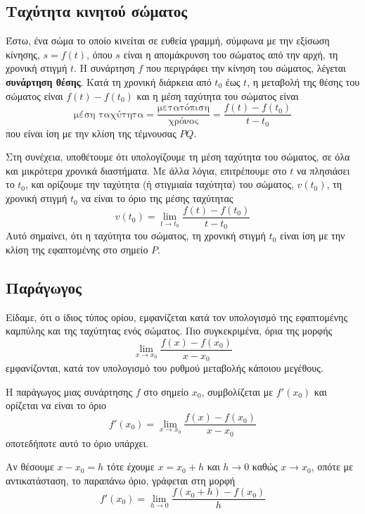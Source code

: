 \subsection*{Ταχύτητα κινητού σώματος}


Έστω, ένα σώμα το οποίο κινείται σε ευθεία γραμμή, σύμφωνα με την εξίσωση κίνησης, 
$ s=f(t) $, όπου $s$ είναι η απομάκρυνση του σώματος από την αρχή, τη χρονική στιγμή
$t$. Η συνάρτηση $f$ που περιγράφει την κίνηση του σώματος, λέγεται 
\textbf{συνάρτηση θέσης}. Κατά τη χρονική διάρκεια από $ t_{0} $ έως $ t $, η μεταβολή 
της θέσης του σώματος είναι $ f(t)-f(t_{0}) $ και η μέση ταχύτητα του σώματος είναι
\[
  \text{μέση ταχύτητα} = \frac{\text{μετατόπιση}}{\text{χρόνος}} = 
  \frac{f(t)-f(t_{0})}{t- t_{0}}  
\] 
που είναι ίση με την κλίση της τέμνουσας $ PQ $.

Στη συνέχεια, υποθέτουμε ότι υπολογίζουμε τη μέση ταχύτητα του σώματος, σε όλα και 
μικρότερα χρονικά διαστήματα. Με άλλα λόγια, επιτρέπουμε στο $t$ να πλησιάσει το 
$ t_{0} $, και ορίζουμε την ταχύτητα (ή στιγμιαία ταχύτητα) του σώματος, $ v(t_{0}) $, 
τη χρονική στιγμή $ t_{0} $ να είναι το όριο της μέσης ταχύτητας
\[
  v(t_{0}) = \lim_{t \to t_{0}} \frac{f(t)-f(t_{0})}{t- t_{0}}  
\] 
Αυτό σημαίνει, ότι η ταχύτητα του σώματος, τη χρονική στιγμή $ t_{0} $ είναι ίση με την 
κλίση της εφαπτομένης στο σημείο $P$.


\subsection*{Παράγωγος}

Είδαμε, ότι ο ίδιος τύπος ορίου, εμφανίζεται κατά τον υπολογισμό της εφαπτομένης 
καμπύλης και της ταχύτητας ενός σώματος. Πιο συγκεκριμένα, όρια της μορφής 
\[
  \lim_{x \to x_{0}} \frac{f(x)-f(x_{0})}{x- x_{0}} 
\] 
εμφανίζονται, κατά τον υπολογισμό του ρυθμού μεταβολής κάποιου μεγέθους.

\begin{dfn}
  Η παράγωγος μιας συνάρτησης $f$ στο σημείο $ x_{0} $, συμβολίζεται με $ f'(x_{0}) $ 
και ορίζεται να είναι το όριο
  \[
    f'(x_{0}) = \lim_{x \to x_{0}} \frac{f(x)-f(x_{0})}{x- x_{0}}
  \] 
  οποτεδήποτε αυτό το όριο υπάρχει.
\end{dfn}

\begin{rem}
  Αν θέσουμε $ x- x_{0}=h $ τότε έχουμε $ x = x_{0}+h $ και $ h \to 0 $ καθώς $ x \to
  x_{0} $, οπότε με αντικατάσταση, το παραπάνω όριο, γράφεται στη μορφή
  \[
    f'(x_{0}) = \lim_{h \to 0} \frac{f(x_{0}+h)-f(x_{0})}{h}
  \] 
\end{rem}








